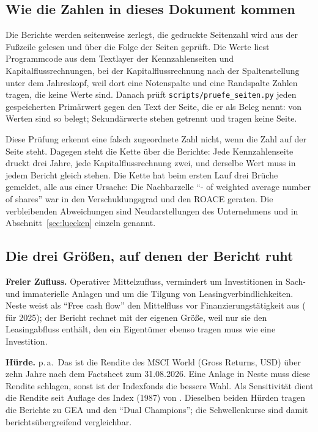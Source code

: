 \subsection*{Wie die Zahlen in dieses Dokument kommen}

Die Berichte werden seitenweise zerlegt, die gedruckte Seitenzahl wird aus der Fu{\ss}zeile
gelesen und \"uber die Folge der Seiten gepr\"uft. Die Werte liest Programmcode aus dem
Textlayer der Kennzahlenseiten und Kapitalflussrechnungen, bei der Kapitalflussrechnung nach
der Spaltenstellung unter dem Jahreskopf, weil dort eine Notenspalte und eine Randspalte
Zahlen tragen, die keine Werte sind. Danach pr\"uft \texttt{scripts/pruefe\_seiten.py} jeden
gespeicherten Prim\"arwert gegen den Text der Seite, die er als Beleg nennt:
\GeprueftAnzahl{} von \GeprueftGesamt{} Werten sind so belegt; \ExternAnzahl{}
Sekund\"arwerte stehen getrennt und tragen keine Seite.

Diese Pr\"ufung erkennt eine falsch zugeordnete Zahl nicht, wenn die Zahl auf der Seite
steht. Dagegen steht die Kette \"uber die Berichte: Jede Kennzahlenseite druckt drei Jahre,
jede Kapitalflussrechnung zwei, und derselbe Wert muss in jedem Bericht gleich stehen. Die
Kette hat beim ersten Lauf drei Br\"uche gemeldet, alle aus einer Ursache: Die
Nachbarzelle \enquote{- of weighted average number of shares} war in den Verschuldungsgrad
und den ROACE geraten.
Die verbleibenden Abweichungen sind Neudarstellungen des Unternehmens und in
Abschnitt~\ref{sec:luecken} einzeln genannt.

\subsection*{Die drei Gr\"o{\ss}en, auf denen der Bericht ruht}

\textbf{Freier Zufluss.} Operativer Mittelzufluss, vermindert um Investitionen in Sach- und
immaterielle Anlagen und um die Tilgung von Leasingverbindlichkeiten. Neste weist als
\enquote{Free cash flow} den Mittelfluss vor Finanzierungst\"atigkeit aus
( f\"ur 2025); der Bericht rechnet mit der eigenen
Gr\"o{\ss}e, weil nur sie den Leasingabfluss enth\"alt, den ein Eigent\"umer ebenso tragen
muss wie eine Investition.

\textbf{H\"urde.} \Pz{\Huerde} p.\,a.\ Das ist die Rendite des MSCI World (Gross Returns,
USD) \"uber zehn Jahre nach dem Factsheet zum 31.08.2026. Eine Anlage in Neste muss diese Rendite
schlagen, sonst ist der Indexfonds die bessere Wahl. Als Sensitivit\"at dient die Rendite
seit Auflage des Index (1987) von \Pz{\HuerdeLang}. Dieselben beiden H\"urden tragen die
Berichte zu GEA und den \enquote{Dual Champions}; die Schwellenkurse sind damit
berichts\"ubergreifend vergleichbar.

